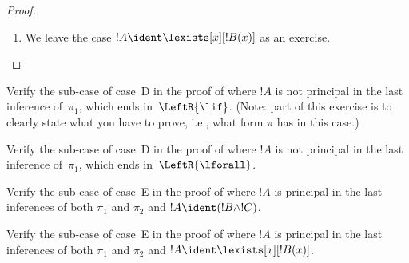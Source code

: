 \documentclass[../../../include/open-logic-section]{subfiles}
\begin{document}
\begin{proof}
\begin{enumerate}
The !!{proof}~$\pi_1'$ has end-sequent $\Gamma \Sequent \Delta,
!B(c)$, where $c$~is the eigenvariable of a~$\RightR{\lforall}$
inference. So $c$~does not occur in~$!B(x)$, $\Gamma$, or~$\Delta$. We
assume the !!{proof}~$\pi$ is regular, so $c$~is the eigenvariable of
only the following~$\RightR{\lforall}$ inference and only occurs above
it, i.e., only occurs in~$\pi_1'$ and is not an eigenvariable of an
inference in~$\pi_1'$. Since $c$ does not occur in~$\pi_2$, it cannot
occur in~$t$. By , the
!!{proof}~$\Subst{\pi_1'}{t}{c}$ is !!a{proof} of $\Gamma \Sequent \Delta,
!B(t)$. We now apply the inductive hypothesis to the !!{proof}
\[
\AxiomC{}
\RightLabel{$\Subst{\pi_1'}{t}{c}$}
\Deduce$\Gamma \fCenter \Delta, !B(t)$
\AxiomC{}
\RightLabel{$\pi_2''$}
\Deduce$!B(t), \Gamma \fCenter \Delta$
\RightLabel{\CutCS}
\BinaryInf$\Gamma \fCenter \Delta$
\DisplayProof
\]
(The induction hypothesis applies since the cut !!{formula}
is~$!B(t)$, so the !!{proof} has lower cut rank than~$\pi$.)
\item We leave the case $!A \ident \lexists[x][!B(x)]$ as an exercise.
\end{enumerate}
\end{proof}

\begin{prob}
Verify the sub-case of case~D in the proof of 
where $!A$ is not principal in the last inference of~$\pi_1$, which
ends in~$\LeftR{\lif}$. (Note: part of this exercise is to clearly
state what you have to prove, i.e., what form $\pi$ has in this case.)
\end{prob}

\begin{prob}
Verify the sub-case of case~D in the proof of 
where $!A$ is not principal in the last inference of~$\pi_1$, which
ends in~$\LeftR{\lforall}$.
\end{prob}

\begin{prob}
Verify the sub-case of case~E in the proof of 
where $!A$ is principal in the last inferences of both $\pi_1$ and
$\pi_2$ and $!A \ident (!B \land !C)$.
\end{prob}

\begin{prob}
Verify the sub-case of case~E in the proof of 
where $!A$ is principal in the last inferences of both $\pi_1$ and
$\pi_2$ and $!A \ident \lexists[x][!B(x)]$.
\end{prob}
\end{document}
